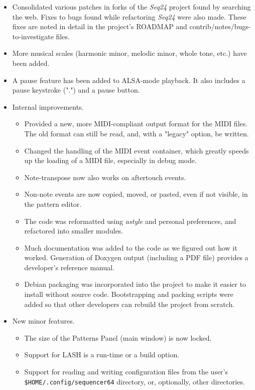 \documentclass[
 11pt,
 twoside,
 a4paper,
 headinclude,
 footinclude,
 final                                 %
]{article}
\begin{document}
\begin{itemize}
      \item Consolidated various patches in forks of the \textsl{Seq24}
         project found by searching the web.  Fixes to bugs found while
         refactoring \textsl{Seq24} were also made.  These fixes are noted in
         detail in the project's ROADMAP and contrib/notes/bugs-to-investigate
         files.
      \item More musical scales (harmonic minor, melodic minor,
         whole tone, etc.) have been added.
      \item A pause feature has been added to ALSA-mode playback.
         It also includes a pause keystroke (".") and a pause button.
      \item Internal improvements.
      \begin{itemize}
         \item Provided a new, more MIDI-compliant output format for the MIDI
            files.  The old format can still be read, and, with a "legacy"
            option, be written.
         \item Changed the handling of the MIDI event container, which greatly
            speeds up the loading of a MIDI file, especially in debug mode.
         \item Note-transpose now also works on aftertouch events.
         \item Non-note events are now copied, moved, or pasted, even if not
            visible, in the pattern editor.
         \item The code was reformatted using \textsl{astyle} and
            personal preferences, and refactored into smaller modules.
         \item Much documentation was added to the code as we figured
            out how it worked.  Generation of Doxygen output (including a PDF
            file) provides a developer's reference manual.
         \item Debian packaging was incorporated into the project to make it
            easier to install without source code.  Bootstrapping and
            packing scripts were added so that other developers can rebuild the
            project from scratch.
      \end{itemize}
      \item New minor features.
      \begin{itemize}
         \item The size of the Patterns Panel (main window) is now locked.
         \item Support for LASH is a run-time or a build option.
         \item Support for reading and writing configuration files from the
            user's \texttt{\$HOME/.config/sequencer64} directory, or,
            optionally, other directories.
      \end{itemize}
   \end{itemize}
\end{document}
